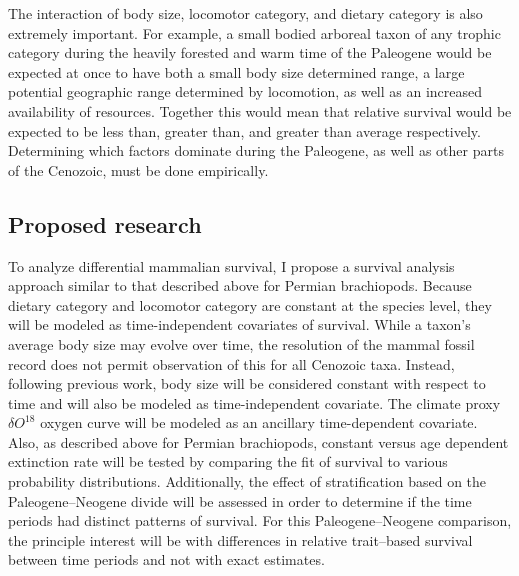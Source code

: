 \documentclass[12pt,letterpaper]{article}
\begin{document}
The interaction of body size, locomotor category, and dietary category is also extremely important. For example, a small bodied arboreal taxon of any trophic category during the heavily forested and warm time of the Paleogene would be expected at once to have both a small body size determined range, a large potential geographic range determined by locomotion, as well as an increased availability of resources. Together this would mean that relative survival would be expected to be less than, greater than, and greater than average respectively. Determining which factors dominate during the Paleogene, as well as other parts of the Cenozoic, must be done empirically.


\subsection{Proposed research} \label{sec:mamsurvmeth}
To analyze differential mammalian survival, I propose a survival analysis approach similar to that described above for Permian brachiopods. Because dietary category and locomotor category are constant at the species level, they will be modeled as time-independent covariates of survival. While a taxon's average body size may evolve over time, the resolution of the mammal fossil record does not permit observation of this for all Cenozoic taxa. Instead, following previous work, body size will be considered constant with respect to time and will also be modeled as time-independent covariate. The climate proxy \(\delta O^{18}\) oxygen curve \citep{Zachos2008} will be modeled as an ancillary time-dependent covariate. Also, as described above for Permian brachiopods, constant versus age dependent extinction rate will be tested by comparing the fit of survival to various probability distributions. Additionally, the effect of stratification based on the Paleogene--Neogene divide will be assessed in order to determine if the time periods had distinct patterns of survival. For this Paleogene--Neogene comparison, the principle interest will be with differences in relative trait--based survival between time periods and not with exact estimates.
\end{document}
